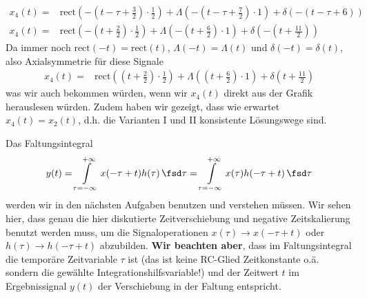 \begin{Loesung}
\begin{align}
x_4(t) = &\mathrm{rect}(-\left(t-\tau+\frac{3}{2}\right)\cdot \frac{1}{2}) + \Lambda(-\left(t-\tau+\frac{7}{2}\right)\cdot 1) + \delta(-(t-\tau+6))\\
x_4(t) = &\mathrm{rect}(-\left(t+\frac{2}{2}\right)\cdot \frac{1}{2}) + \Lambda(-\left(t+\frac{6}{2}\right)\cdot 1) + \delta(-(t+\frac{11}{2}))
\end{align}
Da immer noch $\mathrm{rect}(-t)=\mathrm{rect}(t)$, $\Lambda(-t)=\Lambda(t)$ und $\delta(-t) = \delta(t)$, also Axialsymmetrie für diese Signale
\begin{align}
x_4(t) = &\mathrm{rect}(\left(t+\frac{2}{2}\right)\cdot \frac{1}{2}) + \Lambda(\left(t+\frac{6}{2}\right)\cdot 1) + \delta(t+\frac{11}{2})
\end{align}
was wir auch bekommen würden, wenn wir $x_4(t)$ direkt aus der Grafik herauslesen würden. Zudem haben wir gezeigt, dass wie erwartet $x_4(t)=x_2(t)$, d.h. die Varianten I und II konsistente Lösungswege sind.

\end{Loesung}

\begin{Werkzeug}
Das Faltungsintegral
\begin{equation}
y(t)
= \int\limits_{\tau=-\infty}^{+\infty} x(-\tau+t) h(\tau) \, \fsd \tau
= \int\limits_{\tau=-\infty}^{+\infty} x(\tau) h(-\tau+t) \, \fsd \tau
\end{equation}
werden wir in den nächsten Aufgaben benutzen und verstehen müssen.
%
Wir sehen hier, dass genau die hier
diskutierte Zeitverschiebung und negative Zeitskalierung benutzt werden muss, um
die Signaloperationen $x(\tau) \rightarrow x(-\tau+t)$
oder $h(\tau) \rightarrow h(-\tau+t)$ abzubilden.
\textbf{Wir beachten aber}, dass im Faltungsintegral die temporäre Zeitvariable
$\tau$ ist (das ist keine RC-Glied Zeitkonstante o.ä. sondern die gewählte Integrationshilfsvariable!) und der Zeitwert $t$
im Ergebnissignal $y(t)$ der Verschiebung in der Faltung entspricht.
\end{Werkzeug}

